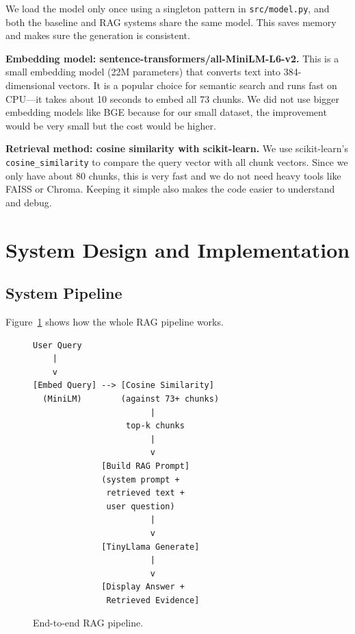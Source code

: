 \documentclass[10pt,conference]{IEEEtran}
\begin{document}
We load the model only once using a singleton pattern in \texttt{src/model.py}, and both the baseline and RAG systems share the same model. This saves memory and makes sure the generation is consistent.

\textbf{Embedding model: sentence-transformers/all-MiniLM-L6-v2.} This is a small embedding model (22M parameters) that converts text into 384-dimensional vectors. It is a popular choice for semantic search and runs fast on CPU---it takes about 10 seconds to embed all 73 chunks. We did not use bigger embedding models like BGE because for our small dataset, the improvement would be very small but the cost would be higher.

\textbf{Retrieval method: cosine similarity with scikit-learn.} We use scikit-learn's \texttt{cosine\_similarity} to compare the query vector with all chunk vectors. Since we only have about 80 chunks, this is very fast and we do not need heavy tools like FAISS or Chroma. Keeping it simple also makes the code easier to understand and debug.

\section{System Design and Implementation}
\label{sec:system}

\subsection{System Pipeline}

Figure~\ref{fig:pipeline} shows how the whole RAG pipeline works.

\begin{figure}[h]
\centering
\begin{lstlisting}[language={},frame=none]
User Query
    |
    v
[Embed Query] --> [Cosine Similarity]
  (MiniLM)        (against 73+ chunks)
                        |
                   top-k chunks
                        |
                        v
              [Build RAG Prompt]
              (system prompt +
               retrieved text +
               user question)
                        |
                        v
              [TinyLlama Generate]
                        |
                        v
              [Display Answer +
               Retrieved Evidence]
\end{lstlisting}
\caption{End-to-end RAG pipeline.}
\label{fig:pipeline}
\end{figure}
\end{document}
